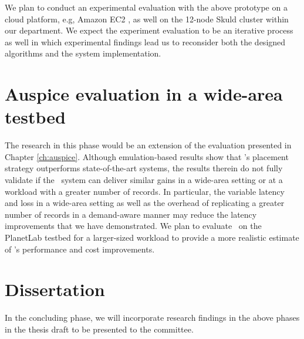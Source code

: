We plan to conduct an experimental evaluation with the above prototype on a cloud platform, e.g, Amazon EC2 \cite{amazonec2}, as well on the 12-node Skuld cluster within our department. We expect the experiment evaluation to be an iterative process as well in which experimental findings lead us to reconsider both the designed algorithms and the system implementation.

\section{Auspice evaluation in a wide-area testbed} 

The research in this phase would be an extension of the evaluation presented in Chapter \ref{ch:auspice}. Although emulation-based results show that \auspice's placement strategy outperforms state-of-the-art systems, the results therein do not fully validate if the \auspice\ system can deliver similar gains in a wide-area setting or at a workload with a greater number of records. In particular, the variable latency and loss in a wide-area setting as well as the overhead of replicating a greater number of records in a demand-aware manner may reduce the latency improvements that we have demonstrated. We plan to evaluate \auspice\ on the PlanetLab testbed for a larger-sized workload to provide a more realistic estimate of \auspice's performance and cost improvements.

\section{Dissertation} 

In the concluding phase, we will incorporate research findings in the above phases in the thesis draft to be presented to the committee.
